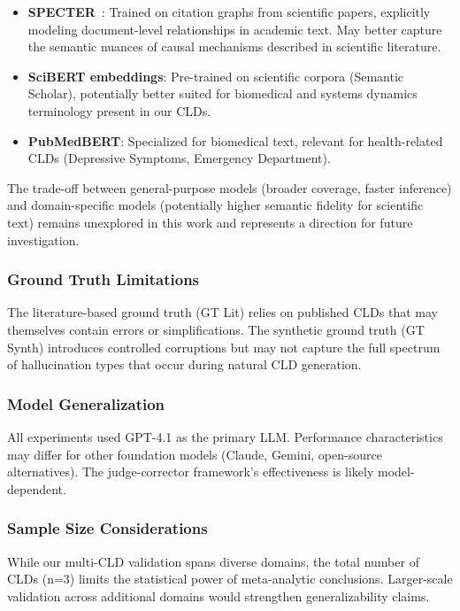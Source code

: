 \begin{itemize}[noitemsep]
    \item \textbf{SPECTER}~\cite{cohan2020specter}: Trained on citation graphs from scientific papers, explicitly modeling document-level relationships in academic text. May better capture the semantic nuances of causal mechanisms described in scientific literature.
    \item \textbf{SciBERT embeddings}: Pre-trained on scientific corpora (Semantic Scholar), potentially better suited for biomedical and systems dynamics terminology present in our CLDs.
    \item \textbf{PubMedBERT}: Specialized for biomedical text, relevant for health-related CLDs (Depressive Symptoms, Emergency Department).
\end{itemize}

The trade-off between general-purpose models (broader coverage, faster inference) and domain-specific models (potentially higher semantic fidelity for scientific text) remains unexplored in this work and represents a direction for future investigation.

\subsubsection{Ground Truth Limitations}

The literature-based ground truth (GT Lit) relies on published CLDs that may themselves contain errors or simplifications. The synthetic ground truth (GT Synth) introduces controlled corruptions but may not capture the full spectrum of hallucination types that occur during natural CLD generation.

\subsubsection{Model Generalization}

All experiments used GPT-4.1 as the primary LLM. Performance characteristics may differ for other foundation models (Claude, Gemini, open-source alternatives). The judge-corrector framework's effectiveness is likely model-dependent.

\subsubsection{Sample Size Considerations}

While our multi-CLD validation spans diverse domains, the total number of CLDs (n=3) limits the statistical power of meta-analytic conclusions. Larger-scale validation across additional domains would strengthen generalizability claims.

